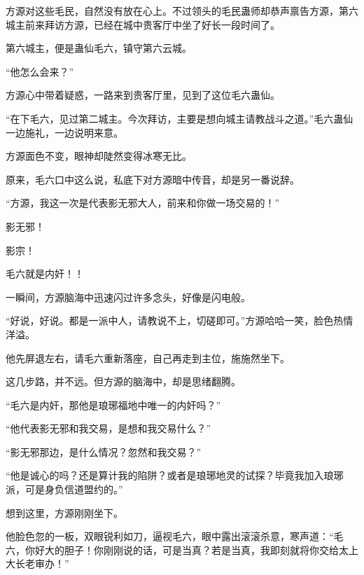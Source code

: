 \begin{this_body}
方源对这些毛民，自然没有放在心上。不过领头的毛民蛊师却恭声禀告方源，第六城主前来拜访方源，已经在城中贵客厅中坐了好长一段时间了。

第六城主，便是蛊仙毛六，镇守第六云城。

“他怎么会来？”

方源心中带着疑惑，一路来到贵客厅里，见到了这位毛六蛊仙。

“在下毛六，见过第二城主。今次拜访，主要是想向城主请教战斗之道。”毛六蛊仙一边施礼，一边说明来意。

方源面色不变，眼神却陡然变得冰寒无比。

原来，毛六口中这么说，私底下对方源暗中传音，却是另一番说辞。

“方源，我这一次是代表影无邪大人，前来和你做一场交易的！”

影无邪！

影宗！

毛六就是内奸！！

一瞬间，方源脑海中迅速闪过许多念头，好像是闪电般。

“好说，好说。都是一派中人，请教说不上，切磋即可。”方源哈哈一笑，脸色热情洋溢。

他先屏退左右，请毛六重新落座，自己再走到主位，施施然坐下。

这几步路，并不远。但方源的脑海中，却是思绪翻腾。

“毛六是内奸，那他是琅琊福地中唯一的内奸吗？”

“他代表影无邪和我交易，是想和我交易什么？”

“影无邪那边，是什么情况？忽然和我交易？”

“他是诚心的吗？还是算计我的陷阱？或者是琅琊地灵的试探？毕竟我加入琅琊派，可是身负信道盟约的。”

想到这里，方源刚刚坐下。

他脸色忽的一板，双眼锐利如刀，逼视毛六，眼中露出滚滚杀意，寒声道：“毛六，你好大的胆子！你刚刚说的话，可是当真？若是当真，我即刻就将你交给太上大长老审办！”

\end{this_body}

